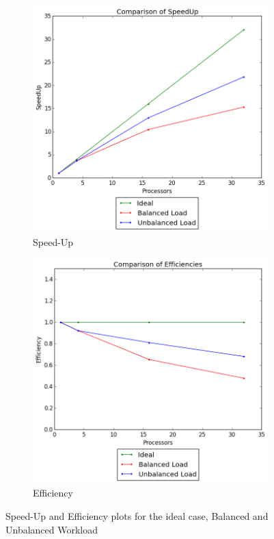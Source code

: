 \documentclass[a4paper]{article}
\begin{document}
    \begin{figure}[htp!]
      \centering
      \begin{subfigure}{.5\textwidth}
        \centering
        \includegraphics[width=.99\textwidth]{../2 Analysis/SpeedUp.png}
        \caption{Speed-Up}
        \label{fig:SpeedUp}
      \end{subfigure}%
      \begin{subfigure}{.5\textwidth}
        \centering
        \includegraphics[width=.99\textwidth]{../2 Analysis/Efficiency.png}
        \caption{Efficiency}
        \label{fig:Efficiency}
      \end{subfigure}
      \caption{Speed-Up and Efficiency plots for the ideal case, Balanced and Unbalanced Workload}
    \end{figure}
\end{document}
